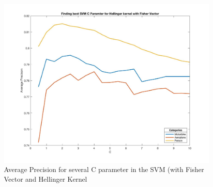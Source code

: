 \documentclass[a4paper,11pt]{exam}
\begin{document}
\begin{figure}[!h]
\centering
\includegraphics[width=13cm]{figures/finding_C.jpg}
\caption{Average Precision for several C parameter in the SVM (with Fisher Vector and Hellinger Kernel}    
\label{finding_C}
\end{figure}








\end{document}
